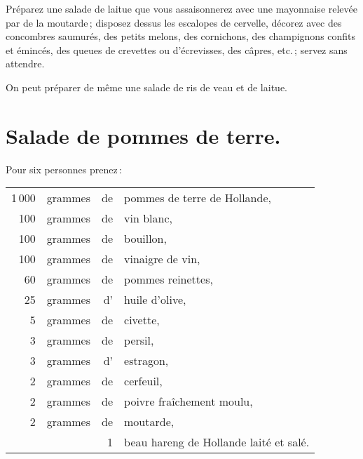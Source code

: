 Préparez une salade de laitue que vous assaisonnerez avec une mayonnaise
relevée par de la moutarde ; disposez dessus les escalopes de cervelle, décorez
avec des concombres saumurés, des petits melons, des cornichons, des
champignons confits et émincés, des queues de crevettes ou d'écrevisses, des
câpres, etc. ; servez sans attendre.

\sk

On peut préparer de même une salade de ris de veau et de laitue.

\section*{\centering Salade de pommes de terre.}
{}

Pour six personnes prenez :

\footnotesize
\begin{longtable}{rrrp{16em}}
  1 000 & grammes & de & pommes de terre de Hollande,                                                     \\
    100 & grammes & de & vin blanc,                                                                       \\
    100 & grammes & de & bouillon,                                                                        \\
    100 & grammes & de & vinaigre de vin,                                                                 \\
     60 & grammes & de & pommes reinettes,                                                                \\
     25 & grammes & d’ & huile d'olive,                                                                   \\
      5 & grammes & de & civette,                                                                         \\
      3 & grammes & de & persil,                                                                          \\
      3 & grammes & d' & estragon,                                                                        \\
      2 & grammes & de & cerfeuil,                                                                        \\
      2 & grammes & de & poivre fraîchement moulu,                                                        \\
      2 & grammes & de & moutarde,                                                                        \\
        &         &  1 & beau hareng de Hollande laité et salé.                                           \\
\end{longtable}
\normalsize


